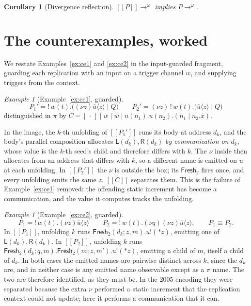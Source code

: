 \documentclass[11pt]{article}
\theoremstyle{definition}
\theoremstyle{plain}
\newtheorem{corollary}[definition]{Corollary}
\theoremstyle{remark}
\newtheorem{example}[definition]{Example}
\newcommand{\drp}[1]{{*}#1}
\newcommand{\out}[2]{#1!(#2)}
\newcommand{\enc}[1]{[\![#1]\!]}
\newcommand{\Lft}{\mathsf{L}}
\newcommand{\Rgt}{\mathsf{R}}
\newcommand{\Frsh}{\mathsf{Fresh}_2}
\begin{document}
\begin{corollary}[Divergence reflection]
$\enc{P} \to^{\omega}$ implies $P \to^{\omega}$.
\end{corollary}

\section{The counterexamples, worked}\label{sec:worked}

We restate Examples~\ref{ex:ce1} and \ref{ex:ce2} in the input-guarded
fragment, guarding each replication with an input on a trigger channel
$w$, and supplying triggers from the context.

\begin{example}[Example~\ref{ex:ce1}, guarded]
\[
P_1' = !\,w(t).\big((\nu z)\bar u\langle z\rangle \mid Q\big)
\qquad
P_2' = (\nu z)\,!\,w(t).\big(\bar u\langle z\rangle \mid Q\big)
\]
distinguished in $\pi$ by
$C = [\,\cdot\,] \mid \bar w \mid \bar w \mid u(n_1).u(n_2).(\bar n_1 \mid n_2.\bar x)$.

In the image, the $k$-th unfolding of $\enc{P_1'}$ runs its body at
address $d_k$, and the body's parallel composition allocates
$\Lft(d_k), \Rgt(d_k)$ \emph{by communication on $d_k$}, whose value is
the $k$-th seed's child and therefore differs with $k$. The $\nu$ inside
then allocates from an address that differs with $k$, so a different name
is emitted on $u$ at each unfolding. In $\enc{P_2'}$ the $\nu$ is outside
the box; its $\Frsh$ fires once, and every unfolding emits the same $z$.
$\enc{C}$ separates them. This is the failure of Example~\ref{ex:ce1}
removed: the offending static increment has become a communication, and
the value it computes tracks the unfolding.
\end{example}

\begin{example}[Example~\ref{ex:ce2}, guarded]
\[
P_1 = !\,w(t).(\nu z)\bar u\langle z\rangle
\qquad
P_2 = !\,w(t).(\nu q)(\nu z)\bar u\langle z\rangle,
\qquad P_1 \equiv P_2 .
\]
In $\enc{P_1}$, unfolding $k$ runs
$\Frsh(d_k; z, m).\out{u}{\drp{z}}$, emitting one of
$\Lft(d_k), \Rgt(d_k)$. In $\enc{P_2}$, unfolding $k$ runs
$\Frsh(d_k; q, m).\Frsh(m; z, m').\out{u}{\drp{z}}$, emitting a child of
$m$, itself a child of $d_k$. In both cases the emitted names are
pairwise distinct across $k$, since the $d_k$ are, and in neither case is
any emitted name observable except as a $\pi$ name. The two are therefore
identified, as they must be. In the 2005 encoding they were separated
because the extra $\nu$ performed a static increment that the replication
context could not update; here it performs a communication that it can.
\end{example}
\end{document}
